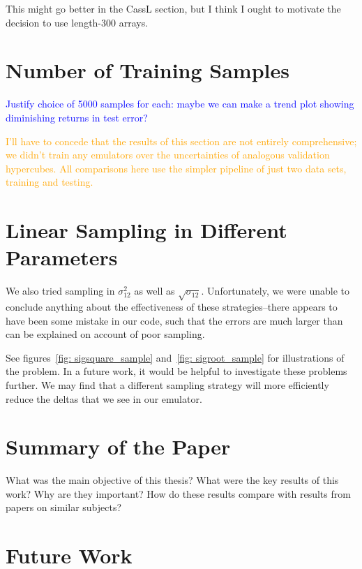 This might go better in the CassL section, but I think I ought to motivate the decision to use length-300 arrays.

\section{Number of Training Samples}
\label{sec: num_samples}

\textcolor{blue}{Justify choice of 5000 samples for each: maybe we can make a
trend plot showing diminishing returns in test error?}


\textcolor{orange}{I'll have to concede that the results of this section are not entirely comprehensive; we didn't train any emulators over the uncertainties of analogous validation hypercubes. All comparisons here use the simpler pipeline of just two data sets, training and testing.}


\section{Linear Sampling in Different Parameters}

We also tried sampling in $\sigma_{12}^2$ as well as $\sqrt{\sigma_{12}}$.
Unfortunately, we were unable to conclude anything about the effectiveness of
these strategies--there appears to have been some mistake in our code, such
that the errors are much larger than can be explained on account of poor
sampling.

See figures~\ref{fig: sigsquare_sample} and~\ref{fig: sigroot_sample} for
illustrations of the problem. In a future work, it would be helpful to
investigate these problems further. We may find that a different sampling
strategy will more efficiently reduce the deltas that we see in our emulator.

\section{Summary of the Paper}

What was the main objective of this thesis? What were the key results of this work? Why are they important? How do these results compare with results from papers on similar subjects?

\section{Future Work}
\label{sec: future_work}

